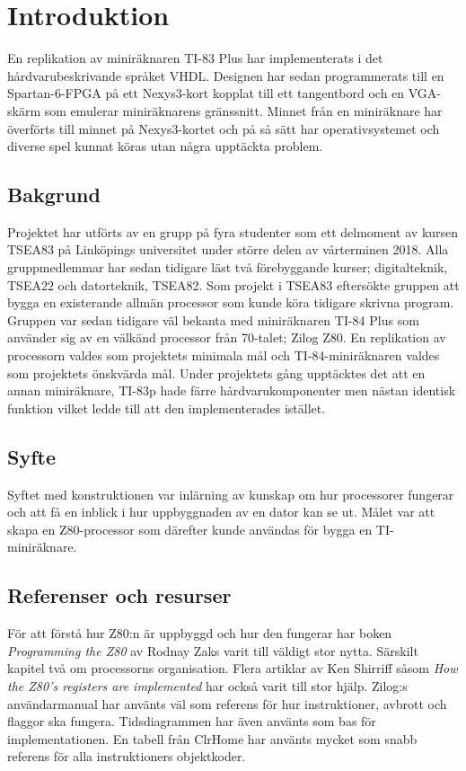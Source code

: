 \documentclass[main.tex]{subfiles}
\begin{document}
\section{Introduktion}
En replikation av miniräknaren TI-83 Plus har implementerats i det
hårdvarubeskrivande språket VHDL. Designen har sedan programmerats till en
Spartan-6-FPGA på ett Nexys3-kort kopplat till ett tangentbord och en VGA-skärm
som emulerar miniräknarens gränssnitt. Minnet från en miniräknare har överförts
till minnet på Nexys3-kortet och på så sätt har operativsystemet och diverse
spel kunnat köras utan några upptäckta problem.

\subsection{Bakgrund}
Projektet har utförts av en grupp på fyra studenter som ett delmoment av kursen
TSEA83 på Linköpings universitet under större delen av vårterminen 2018. Alla
gruppmedlemmar har sedan tidigare läst två förebyggande kurser; digitalteknik,
TSEA22 och datorteknik, TSEA82. Som projekt i TSEA83 eftersökte gruppen att
bygga en existerande allmän processor som kunde köra tidigare skrivna program.
Gruppen var sedan tidigare väl bekanta med miniräknaren TI-84 Plus som använder
sig av en välkänd processor från 70-talet; Zilog Z80. En replikation av
processorn valdes som projektets minimala mål och TI-84-miniräknaren valdes som
projektets önskvärda mål. Under projektets gång upptäcktes det att en annan
miniräknare, TI-83p hade färre hårdvarukomponenter men nästan identisk funktion
vilket ledde till att den implementerades istället.

\subsection{Syfte}
Syftet med konstruktionen var inlärning av kunskap om hur processorer fungerar
och att få en inblick i hur uppbyggnaden av en dator kan se ut. Målet var att
skapa en Z80-processor som därefter kunde användas för bygga en TI-miniräknare.

\subsection{Referenser och resurser}
För att förstå hur Z80:n är uppbyggd och hur den fungerar har boken {\it
Programming the Z80}\cite{zaks-z80prog} av Rodnay Zaks varit till väldigt stor
nytta. Särskilt kapitel två om processorns organisation. Flera artiklar av Ken
Shirriff såsom {\it How the Z80's registers are implemented}\cite{shirriff-reg}
har också varit till stor hjälp. Zilog:s användarmanual\cite{z80um} har använts
väl som referens för hur instruktioner, avbrott och flaggor ska fungera.
Tidsdiagrammen har även använts som bas för implementationen. En tabell från
ClrHome\cite{clrhome} har använts mycket som snabb referens för alla
instruktioners objektkoder.
\end{document}
